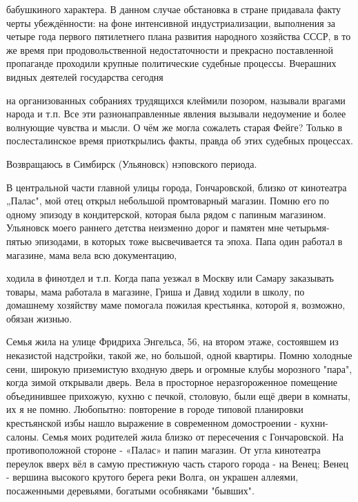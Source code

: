 \label{131-1}
бабушкиного характера. В данном случае обстановка в стране придавала факту черты убеждённости: на фоне интенсивной индустриализации, выполнения за четыре года первого пятилетнего плана развития народного хозяйства СССР, в то же время при продовольственной недостаточности и прекрасно поставленной пропаганде проходили крупные политические судебные процессы. Вчерашних видных деятелей государства сегодня

\label{132-1}
на организованных собраниях трудящихся клеймили позором, называли врагами народа и т.п. Все эти разнонаправленные явления вызывали недоумение и более волнующие чувства и мысли. О чём же могла сожалеть старая Фейге? Только в послесталинское время приоткрылись факты, правда об этих судебных процессах. 

Возвращаюсь в Симбирск (Ульяновск) нэповского периода.

\label{133-1}
В центральной части главной улицы города, Гончаровской, близко от кинотеатра „Палас", мой отец открыл небольшой промтоварный магазин. Помню его по одному эпизоду в кондитерской, которая была рядом с папиным магазином. Ульяновск моего раннего детства неизменно дорог и памятен мне четырьмя-пятью эпизодами, в которых тоже высвечивается та эпоха. Папа один работал в магазине, мама вела всю документацию,

\label{134-1}
ходила в финотдел и т.п. Когда папа уезжал в Москву или Самару заказывать товары, мама работала в магазине, Гриша и Давид ходили в школу, по домашнему хозяйству маме помогала пожилая крестьянка, которой я, возможно, обязан жизнью. 

Семья жила на улице Фридриха Энгельса, 56, на втором этаже, состоявшем из неказистой надстройки, такой же, но большой, одной квартиры. Помню холодные сени, широкую приземистую входную дверь и огромные клубы морозного "пара", когда зимой открывали дверь. Вела в просторное неразгороженное помещение объединившее 
\label{135-1}
прихожую, кухню с печкой, столовую, были ещё двери в комнаты, их я не помню. Любопытно: повторение в городе типовой планировки крестьянской избы нашло выражение в современном домостроении - кухни-салоны. Семья моих родителей жила близко от пересечения с Гончаровской. На противоположной стороне - «Палас» и папин магазин. От угла кинотеатра переулок вверх вёл в самую престижную часть старого города - на Венец; Венец - вершина высокого крутого берега реки Волга, он украшен аллеями, посаженными деревьями, богатыми особняками "бывших".

